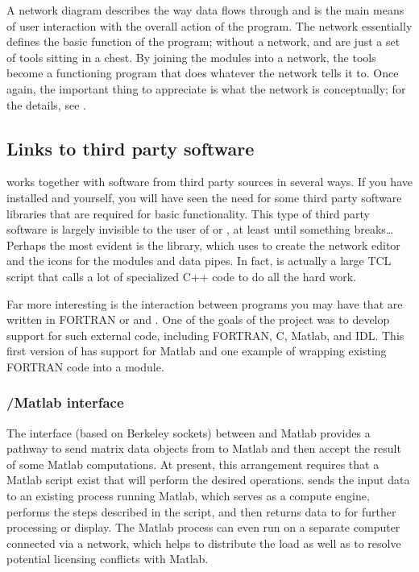 A network diagram  describes the way data flows
through \SR{} and is the main means of user interaction with the overall
action of the program.  The network essentially defines the basic function of
the program; without a network, \SR{} and \PSE{} are just a set of tools
sitting in a chest.  By joining the modules into a network, the tools
become a functioning program that does whatever the network tells it to.
Once again, the important thing to appreciate is what the network is
conceptually; for the details, see . 


\subsection{Links to third party software}
\label{sec:con-links} 

\SR{} works together with software from third party sources in several
ways.  If you have installed \SR{} and \PSE{} yourself, you will have seen
the need for some third party software libraries that are required for
basic functionality.  This type of third party software is largely
invisible to the user of \SR{} or \PSE{}, at least until something
breaks\ldots{} Perhaps the most evident is the
  library,
which \SR{} uses to create the network editor and the icons for the modules
and data pipes.  In fact, \SR{} is actually a large TCL script that calls a
lot of specialized C++ code to do all the hard work.


Far more interesting is the interaction between programs you may have that
are written in FORTRAN  or
 and
\SR{}.  One of the goals of the \PSE{} project was to develop support for
such external code, including FORTRAN, C, Matlab, and IDL\@.  This first
version of \PSE{} has support for Matlab and one example of wrapping
existing FORTRAN code into a \SR{} module. 

\subsubsection{\SR{}/Matlab interface}
\label{sec:concept-matlab} 

The interface (based on Berkeley sockets) between \SR{} and Matlab provides
a pathway to send matrix data objects from \SR{} to Matlab and then accept
the result of some Matlab computations.  At present, this arrangement
requires that a Matlab script exist that will perform the desired
operations.  \SR{} sends the input data to an existing process running
Matlab, which serves as a compute engine, performs the steps
described in the script, and then returns data to \SR{} for further
processing or display.  The Matlab process can even run on a separate
computer connected via a network, which helps to distribute the load as
well as to resolve potential licensing conflicts with Matlab.

